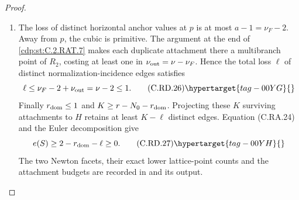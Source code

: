\begin{proof}
\begin{enumerate}[label={$\langle1\rangle$\arabic*.},leftmargin=*]
\item The loss of distinct horizontal anchor values
at $p$ is at most $a-1=\nu_F-2$. Away from
$p$, the cubic is primitive. The argument at
the end of \ref{cdp:st:C.2.RAT.7} makes each duplicate
attachment there a multibranch point of $R_2$,
costing at least one in
$\nu_{\rm out}=\nu-\nu_F$. Hence the total
loss $\ell$ of distinct normalization-incidence
edges satisfies
\[
                    \ell\le\nu_F-2+\nu_{\rm out}
                              =\nu-2\le1.
\tag{C.RD.26}\hypertarget{tag-00YG}{}\label{cdp:eq:C.RD.26}
\]
Finally $r_{\rm dom}\le1$ and
$K\ge r-N_0-r_{\rm dom}$. Projecting these
$K$ surviving attachments to $H$ retains at
least $K-\ell$ distinct edges. Equation
(C.RA.24) and the Euler decomposition give
\[
                 e(S)\ge2-r_{\rm dom}-\ell\ge0.
\tag{C.RD.27}\hypertarget{tag-00YH}{}\label{cdp:eq:C.RD.27}
\]
The two Newton facets, their exact lower
lattice-point counts and the attachment
budgets are recorded in
 and its output.

\end{enumerate}
\end{proof}
